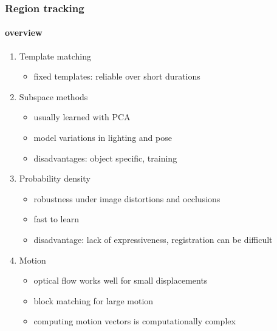 \begin{frame}
\frametitle{Region tracking}
\framesubtitle{overview}
\logoCSIPCPL\mypagenum
	\begin{enumerate}
		\item Template matching
			\begin{itemize}
				\item fixed templates: reliable over short durations 
			\end{itemize}
		\item Subspace methods
			\begin{itemize}
				\item usually learned with PCA
				\item model variations in lighting and pose
				\item disadvantages: object specific, training
			\end{itemize}			
		\item Probability density
			\begin{itemize}
				\item robustness under image distortions and occlusions
				\item fast to learn
				\item disadvantage: lack of expressiveness, registration can be difficult
			\end{itemize}
		\item Motion
			\begin{itemize}
				\item optical flow works well for small displacements
				\item block matching for large motion
				\item computing motion vectors is computationally complex
			\end{itemize}
	\end{enumerate}
\end{frame}


